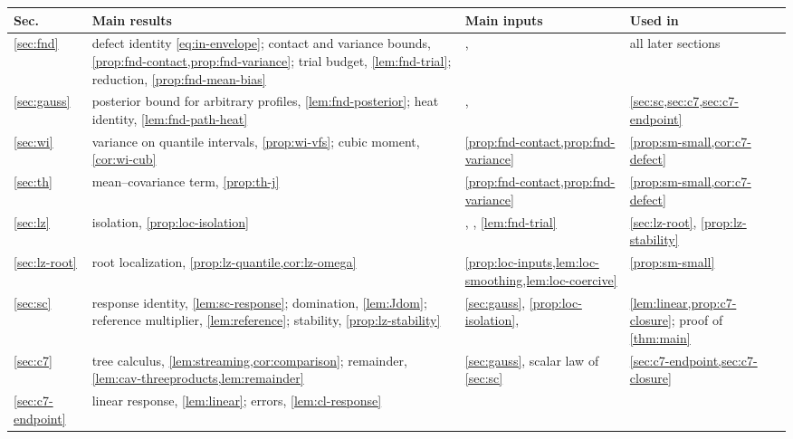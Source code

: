 \begin{table}[!tb]
\centering
\small
\begin{tabular}{@{}>{\raggedright\arraybackslash}p{}
 >{\raggedright\arraybackslash}p{}
 >{\raggedright\arraybackslash}p{}
 >{\raggedright\arraybackslash}p{}@{}}
\toprule
Sec. & Main results & Main inputs & Used in\\
\midrule
\ref{sec:fnd} & defect identity \eqref{eq:in-envelope}; contact and
 variance bounds, \cref{prop:fnd-contact,prop:fnd-variance}; trial
 budget, \cref{lem:fnd-trial}; reduction, \cref{prop:fnd-mean-bias}
 & \cite[Section~2, Lemma~7.2, Theorem~7.8]{AL},
 \cite{ChenConvexity} & all later sections\\
\ref{sec:gauss} & posterior bound for arbitrary profiles,
 \cref{lem:fnd-posterior}; heat identity, \cref{lem:fnd-path-heat}
 & \cite[Section~2]{AL},
 \cite[Lemma~2.3]{OpenAIFluctuationScale}
 & \cref{sec:sc,sec:c7,sec:c7-endpoint}\\
\ref{sec:wi} & variance on quantile intervals, \cref{prop:wi-vfs};
 cubic moment, \cref{cor:wi-cub}
 & \cref{prop:fnd-contact,prop:fnd-variance}
 & \cref{prop:sm-small,cor:c7-defect}\\
\ref{sec:th} & mean--covariance term, \cref{prop:th-j}
 & \cref{prop:fnd-contact,prop:fnd-variance}
 & \cref{prop:sm-small,cor:c7-defect}\\
\ref{sec:lz} & isolation, \cref{prop:loc-isolation}
 & \cite[Section~7.4, Appendix~A]{AL}, \cite[Theorem~1.1]{Lopatto},
 \cref{lem:fnd-trial}
 & \cref{sec:lz-root}, \cref{prop:lz-stability}\\
\ref{sec:lz-root} & root localization,
 \cref{prop:lz-quantile,cor:lz-omega}
 & \cref{prop:loc-inputs,lem:loc-smoothing,lem:loc-coercive}
 & \cref{prop:sm-small}\\
\ref{sec:sc} & response identity, \cref{lem:sc-response}; domination,
 \cref{lem:Jdom}; reference multiplier, \cref{lem:reference};
 stability, \cref{prop:lz-stability}
 & \cref{sec:gauss}, \cref{prop:loc-isolation},
 \cite{Lopatto,AuffingerChen2015Uniqueness}
 & \cref{lem:linear,prop:c7-closure}; proof of \cref{thm:main}\\
\ref{sec:c7} & tree calculus, \cref{lem:streaming,cor:comparison};
 remainder, \cref{lem:cav-threeproducts,lem:remainder}
 & \cref{sec:gauss}, scalar law of \cref{sec:sc}
 & \cref{sec:c7-endpoint,sec:c7-closure}\\
\ref{sec:c7-endpoint} & linear response, \cref{lem:linear}; errors,
 \cref{lem:cl-response}

\end{tabular}
\end{table}
